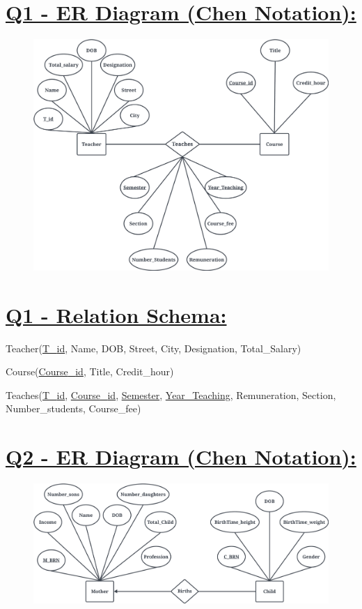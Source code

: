 \documentclass[a4paper, 12pt]{article}
\begin{document}
\section{\textbf{\uline{Q1 - ER Diagram (Chen Notation):}}}
\begin{figure}
    \centering
    \includegraphics[width=1\linewidth]{Q1.jpeg}
\end{figure}


\section{\textbf{\uline{Q1 - Relation Schema:}}}
Teacher(\uline{T{\_}id}, Name, DOB, Street, City, Designation, Total{\_}Salary)

Course(\uline{Course{\_}id}, Title, Credit{\_}hour)

Teaches(\uline{T{\_}id}, \uline{Course{\_}id}, \uline{Semester}, \uline{Year\_Teaching}, Remuneration, Section, Number\_students, Course\_fee)


\break
\section{\textbf{\uline{Q2 - ER Diagram (Chen Notation):}}}
\begin{figure}
    \centering
    \includegraphics[width=1\linewidth]{Q2.jpeg}
    
    
\end{figure}
\end{document}
